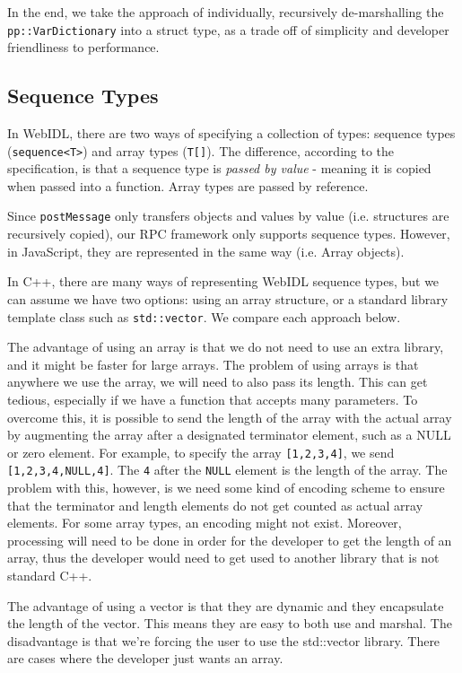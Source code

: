 In the end, we take the approach of individually, recursively de-marshalling the \lstinline{pp::VarDictionary} into a struct type, as a trade off of simplicity and developer friendliness to performance.

\subsection{Sequence Types} %
\label{sub:sequence_types}
In WebIDL, there are two ways of specifying a collection of types: sequence types (\lstinline{sequence<T>}) and array types (\lstinline{T[]}). The difference, according to the specification, is that a sequence type is \emph{passed by value} - meaning it is copied when passed into a function. Array types are passed by reference. 

Since \lstinline{postMessage} only transfers objects and values by value (i.e. structures are recursively copied), our RPC framework only supports sequence types. However, in JavaScript, they are represented in the same way (i.e. Array objects).

In C++, there are many ways of representing WebIDL sequence types, but we can assume we have two options: using an array structure, or a standard library template class such as \lstinline{std::vector}. We compare each approach below.

The advantage of using an array is that we do not need to use an extra library, and it might be faster for large arrays. The problem of using arrays is that anywhere we use the array, we will need to also pass its length. This can get tedious, especially if we have a function that accepts many parameters. To overcome this, it is possible to send the length of the array with the actual array by augmenting the array after a designated terminator element, such as a NULL or zero element. For example, to specify the array \lstinline{[1,2,3,4]}, we send \lstinline{[1,2,3,4,NULL,4]}. The \lstinline{4} after the \lstinline{NULL} element is the length of the array. The problem with this, however, is we need some kind of encoding scheme to ensure that the terminator and length elements do not get counted as actual array elements. For some array types, an encoding might not exist. Moreover, processing will need to be done in order for the developer to get the length of an array, thus the developer would need to get used to another library that is not standard C++.

The advantage of using a vector is that they are dynamic and they encapsulate the length of the vector. This means they are easy to both use and marshal. The disadvantage is that we're forcing the user to use the std::vector library. There are cases where the developer just wants an array.

